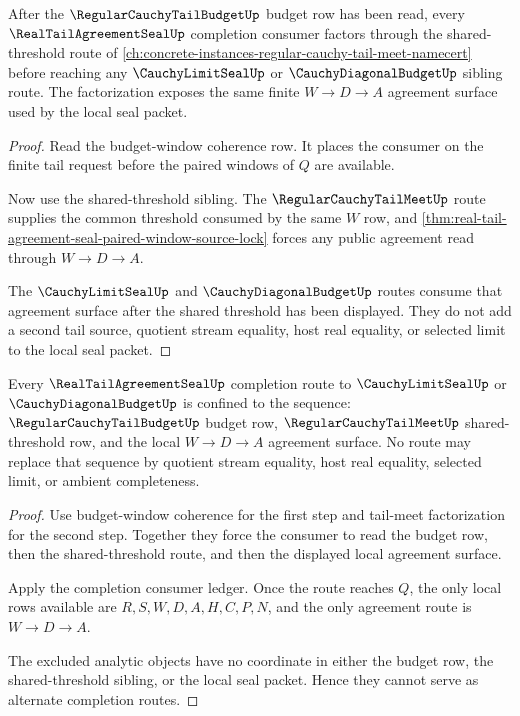 \begin{theorem}
\label{thm:real-tail-agreement-seal-tail-meet-factorization}
After the $\RegularCauchyTailBudgetUp$ budget row has been read, every $\RealTailAgreementSealUp$ completion consumer factors through the shared-threshold route of \autoref{ch:concrete-instances-regular-cauchy-tail-meet-namecert} before reaching any $\CauchyLimitSealUp$ or $\CauchyDiagonalBudgetUp$ sibling route. The factorization exposes the same finite $W \to D \to A$ agreement surface used by the local seal packet.
\end{theorem}
\begin{proof}
Read the budget-window coherence row. It places the consumer on the finite tail request before the paired windows of $Q$ are available.

Now use the shared-threshold sibling. The $\RegularCauchyTailMeetUp$ route supplies the common threshold consumed by the same $W$ row, and \autoref{thm:real-tail-agreement-seal-paired-window-source-lock} forces any public agreement read through $W \to D \to A$.

The $\CauchyLimitSealUp$ and $\CauchyDiagonalBudgetUp$ routes consume that agreement surface after the shared threshold has been displayed. They do not add a second tail source, quotient stream equality, host real equality, or selected limit to the local seal packet.
\end{proof}

\begin{theorem}
\label{thm:real-tail-agreement-seal-completion-route-nonescape}
Every $\RealTailAgreementSealUp$ completion route to $\CauchyLimitSealUp$ or $\CauchyDiagonalBudgetUp$ is confined to the sequence: $\RegularCauchyTailBudgetUp$ budget row, $\RegularCauchyTailMeetUp$ shared-threshold row, and the local $W \to D \to A$ agreement surface. No route may replace that sequence by quotient stream equality, host real equality, selected limit, or ambient completeness.
\end{theorem}
\begin{proof}
Use budget-window coherence for the first step and tail-meet factorization for the second step. Together they force the consumer to read the budget row, then the shared-threshold route, and then the displayed local agreement surface.

Apply the completion consumer ledger. Once the route reaches $Q$, the only local rows available are $R,S,W,D,A,H,C,P,N$, and the only agreement route is $W \to D \to A$.

The excluded analytic objects have no coordinate in either the budget row, the shared-threshold sibling, or the local seal packet. Hence they cannot serve as alternate completion routes.
\end{proof}

